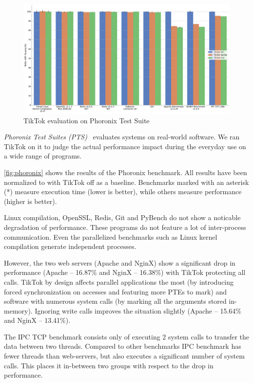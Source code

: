 \documentclass[conference]{IEEEtran}
\newcommand{\sysname}{TikTok}
\begin{document}
\begin{figure}[]
  \centering
  \includegraphics[width=\linewidth]{graphs/phoronix.png}
  \caption{\sysname{} evaluation on Phoronix Test Suite}
  \label{fig:phoronix}
\end{figure}

\emph{Phoronix Test Suites (PTS)}~\cite{pts} evaluates systems on real-world
software. We ran \sysname{} on it to judge the actual performance impact during
the everyday use on a wide range of programs.

\autoref{fig:phoronix} shows the results of the Phoronix benchmark. All results
have been normalized to with \sysname{} off as a baseline. Benchmarks marked
with an asterisk (*) measure execution time (lower is better), while others
measure performance (higher is better).

Linux compilation, OpenSSL, Redis, Git and PyBench do not show a noticable
degradation of performance. These programs do not feature a lot of inter-process
communication. Even the parallelized benchmarks such as Linux kernel compilation
generate independent processes.

However, the two web servers (Apache and NginX) show a significant drop in
performance (Apache -- 16.87\% and NginX -- 16.38\%) with \sysname{} protecting
all calls. \sysname{} by design affects parallel applications the most (by
introducing forced synchronization on accesses and featuring more PTEs to mark)
and software with numerous system calls (by marking all the arguments stored
in-memory). Ignoring write calls improves the situation slightly (Apache --
15.64\% and NginX -- 13.41\%).

The IPC TCP benchmark consists only of executing 2 system calls to transfer
the data between two threads. Compared to other benchmarks IPC benchmark has fewer
threads than web-servers, but also executes a significant number of system calls.
This places it in-between two groups with respect to the drop in performance.
\end{document}
